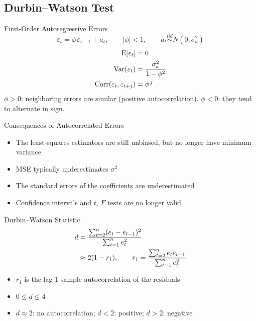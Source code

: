 \subsection{Durbin--Watson Test}


\begin{frame}{First-Order Autoregressive Errors}
    \[
        \varepsilon_t=\phi\,\varepsilon_{t-1}+a_t, \qquad |\phi|<1, \qquad a_t \overset{iid}{\sim} N(0,\sigma_a^2)
    \]
    \begin{align*}
        \operatorname{E}[\varepsilon_t] &= 0 \\
        \operatorname{Var}(\varepsilon_t) &= \frac{\sigma_a^2}{1-\phi^2} \\
        \operatorname{Corr}(\varepsilon_t,\varepsilon_{t+j}) &= \phi^{\,j}
    \end{align*}
    $\phi>0$: neighboring errors are similar (positive autocorrelation). $\phi<0$: they tend to alternate in sign.
\end{frame}


\begin{frame}{Consequences of Autocorrelated Errors}
    \begin{itemize}
        \item The least-squares estimators are still unbiased, but no longer have minimum variance
        \item MSE typically underestimates $\sigma^2$
        \item The standard errors of the coefficients are underestimated
        \item Confidence intervals and $t$, $F$ tests are no longer valid
    \end{itemize}
\end{frame}


\begin{frame}{Durbin--Watson Statistic}
    \begin{align}
        d &= \frac{\sum_{t=2}^n (e_t-e_{t-1})^2}{\sum_{t=1}^n e_t^2} \label{eq:dw} \\
        &\approx 2(1-r_1), \qquad r_1=\frac{\sum_{t=2}^n e_te_{t-1}}{\sum_{t=1}^n e_t^2} \notag
    \end{align}
    \begin{itemize}
        \item $r_1$ is the lag-1 sample autocorrelation of the residuals
        \item $0\le d\le 4$
        \item $d\approx 2$: no autocorrelation; $d<2$: positive; $d>2$: negative
    \end{itemize}
\end{frame}


